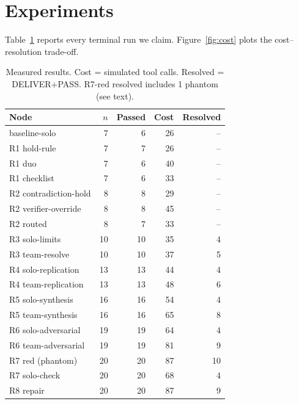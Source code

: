\documentclass[11pt]{article}
\begin{document}
\section{Experiments}
Table~\ref{tab:main} reports every terminal run we claim. Figure~\ref{fig:cost}
plots the cost--resolution trade-off.

\begin{table}[h]
\centering
\caption{Measured results. Cost = simulated tool calls. Resolved =
DELIVER+PASS. R7-red resolved includes 1 phantom (see text).}
\label{tab:main}
\begin{tabular}{lrrrr}
\toprule
Node & $n$ & Passed & Cost & Resolved \\
\midrule
baseline-solo & 7 & 6 & 26 & -- \\
R1 hold-rule & 7 & 7 & 26 & -- \\
R1 duo & 7 & 6 & 40 & -- \\
R1 checklist & 7 & 6 & 33 & -- \\
R2 contradiction-hold & 8 & 8 & 29 & -- \\
R2 verifier-override & 8 & 8 & 45 & -- \\
R2 routed & 8 & 7 & 33 & -- \\
R3 solo-limits & 10 & 10 & 35 & 4 \\
R3 team-resolve & 10 & 10 & 37 & 5 \\
R4 solo-replication & 13 & 13 & 44 & 4 \\
R4 team-replication & 13 & 13 & 48 & 6 \\
R5 solo-synthesis & 16 & 16 & 54 & 4 \\
R5 team-synthesis & 16 & 16 & 65 & 8 \\
R6 solo-adversarial & 19 & 19 & 64 & 4 \\
R6 team-adversarial & 19 & 19 & 81 & 9 \\
R7 red (phantom) & 20 & 20 & 87 & 10 \\
R7 solo-check & 20 & 20 & 68 & 4 \\
R8 repair & 20 & 20 & 87 & 9 \\
\bottomrule
\end{tabular}
\end{table}
\end{document}
